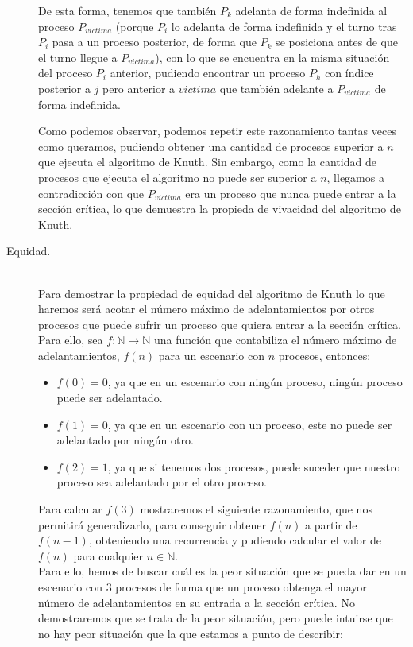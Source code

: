\begin{description}
        De esta forma, tenemos que también $P_k$ adelanta de forma indefinida al proceso $P_{victima}$ (porque $P_i$ lo adelanta de forma indefinida y el turno tras $P_i$ pasa a un proceso posterior, de forma que $P_k$ se posiciona antes de que el turno llegue a $P_{victima}$), con lo que se encuentra en la misma situación del proceso $P_i$ anterior, pudiendo encontrar un proceso $P_h$ con índice posterior a $j$ pero anterior a $victima$ que también adelante a $P_{victima}$ de forma indefinida.

        Como podemos observar, podemos repetir este razonamiento tantas veces como queramos, pudiendo obtener una cantidad de procesos superior a $n$ que ejecuta el algoritmo de Knuth. Sin embargo, como la cantidad de procesos que ejecuta el algoritmo no puede ser superior a $n$, llegamos a contradicción con que $P_{victima}$ era un proceso que nunca puede entrar a la sección crítica, lo que demuestra la propieda de vivacidad del algoritmo de Knuth.
    \item [Equidad.]~\\
        Para demostrar la propiedad de equidad del algoritmo de Knuth lo que haremos será acotar el número máximo de adelantamientos por otros procesos que puede sufrir un proceso que quiera entrar a la sección crítica. Para ello, sea $f:\mathbb{N}\rightarrow\mathbb{N}$ una función que contabiliza el número máximo de adelantamientos, $f(n)$ para un escenario con $n$ procesos, entonces:
        \begin{itemize}
            \item $f(0) = 0$, ya que en un escenario con ningún proceso, ningún proceso puede ser adelantado.
            \item $f(1) = 0$, ya que en un escenario con un proceso, este no puede ser adelantado por ningún otro.
            \item $f(2) = 1$, ya que si tenemos dos procesos, puede suceder que nuestro proceso sea adelantado por el otro proceso.
        \end{itemize}
        Para calcular $f(3)$ mostraremos el siguiente razonamiento, que nos permitirá generalizarlo, para conseguir obtener $f(n)$ a partir de $f(n-1)$, obteniendo una recurrencia y pudiendo calcular el valor de $f(n)$ para cualquier $n\in \mathbb{N}$.\\

        Para ello, hemos de buscar cuál es la peor situación que se pueda dar en un escenario con 3 procesos de forma que un proceso obtenga el mayor número de adelantamientos en su entrada a la sección crítica. No demostraremos que se trata de la peor situación, pero puede intuirse que no hay peor situación que la que estamos a punto de describir:


\end{description}
